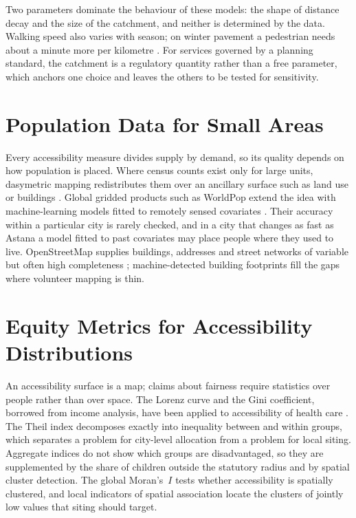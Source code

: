 Two parameters dominate the behaviour of these models: the shape of distance decay and the size of the catchment, and neither is determined by the data. Walking speed also varies with season; on winter pavement a pedestrian needs about a minute more per kilometre \cite{winterwalk2021}. For services governed by a planning standard, the catchment is a regulatory quantity rather than a free parameter, which anchors one choice and leaves the others to be tested for sensitivity.

\section{Population Data for Small Areas}
\label{sec:population-data}

Every accessibility measure divides supply by demand, so its quality depends on how population is placed. Where census counts exist only for large units, dasymetric mapping redistributes them over an ancillary surface such as land use or buildings \cite{mennis2003}. Global gridded products such as WorldPop extend the idea with machine-learning models fitted to remotely sensed covariates \cite{tatem2017}. Their accuracy within a particular city is rarely checked, and in a city that changes as fast as Astana a model fitted to past covariates may place people where they used to live. OpenStreetMap supplies buildings, addresses and street networks of variable but often high completeness \cite{haklay2010}; machine-detected building footprints fill the gaps where volunteer mapping is thin.

\section{Equity Metrics for Accessibility Distributions}
\label{sec:equity}

An accessibility surface is a map; claims about fairness require statistics over people rather than over space. The Lorenz curve and the Gini coefficient, borrowed from income analysis, have been applied to accessibility of health care \cite{neutens2015}. The Theil index \cite{theil1967} decomposes exactly into inequality between and within groups, which separates a problem for city-level allocation from a problem for local siting. Aggregate indices do not show which groups are disadvantaged, so they are supplemented by the share of children outside the statutory radius and by spatial cluster detection. The global Moran's~$I$ \cite{moran1950} tests whether accessibility is spatially clustered, and local indicators of spatial association \cite{anselin1995} locate the clusters of jointly low values that siting should target.

